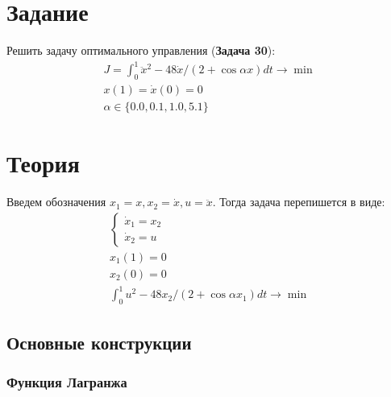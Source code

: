 \documentclass[a4paper,12pt]{article}
\newcommand{\UpdateMe}[1]{\textcolor{red}{#1}}
\newcommand{\University}{Московский государственный университет имени М.~В.~Ломоносова}
\newcommand{\Department}{Кафедра \UpdateMe{НАЗВАНИЕ-КАФЕДРЫ}}
\newcommand{\Student}{\UpdateMe{ИМЯ-СТУДЕНТА}}
\newcommand{\GroupNum}{\UpdateMe{НОМЕР}}
\newcommand{\Seminar}{Численные методы в задачах оптимального управления}
\begin{document}

\section*{Задание}
Решить задачу оптимального управления ({\bfseries Задача 30}):
\begin{gather*}
  J = \int_0^1 \ddot{x}^2-48\dot{x}/\left(2+\cos{\alpha x}\right)dt \rightarrow \min\\
  x(1)=\dot{x}(0)=0\\
  \alpha\in\{0.0, 0.1, 1.0, 5.1\}
\end{gather*}

\section*{Теория}

Введем обозначения \(x_1=x, x_2=\dot{x}, u=\ddot{x}\). Тогда задача
перепишется в виде:
\begin{gather*}
  \begin{cases}\dot{x}_1=x_2\\ \dot{x}_2=u \end{cases}\\
  x_1(1)=0\\
  x_2(0)=0\\
  \int_0^1 u^2-48x_2/\left(2+\cos{\alpha x_1}\right)dt \rightarrow \min
\end{gather*}

\subsection*{Основные конструкции}

\subsubsection*{Функция Лагранжа}
\end{document}
